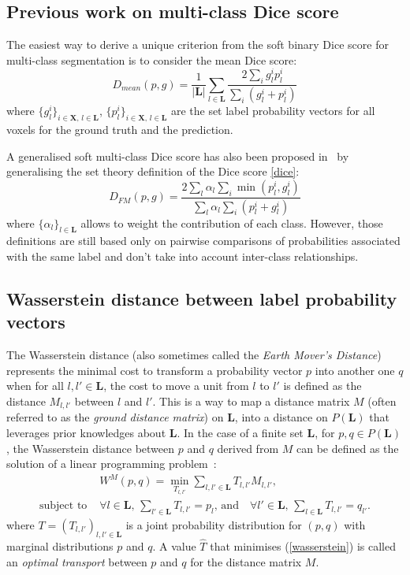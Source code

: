 \documentclass[runningheads,orivec,a4paper]{llncs}
\begin{document}
\subsection{Previous work on multi-class Dice score}
The easiest way to derive a unique criterion from the soft binary Dice score for multi-class segmentation is to consider the mean Dice score:
\begin{equation}\label{mean_dice}
 D_{mean}(p,g) = \frac{1}{|\mathbf{L}|}\sum_{l \in \mathbf{L}}\frac{2\sum_i g^i_lp^i_l}{\sum_i (g^i_l + p^i_l)}
\end{equation}
where $\{g^i_l\}_{i \in \mathbf{X},\, l \in \mathbf{L}}$, $\{p^i_l\}_{i \in \mathbf{X},\, l \in \mathbf{L}}$ are the set label probability vectors for all voxels for the ground truth and the prediction.

A generalised soft multi-class Dice score has also been
proposed in~\cite{gdsc,Sudre2017} by generalising the set theory definition of
the Dice score \eqref{dice}: 
\begin{equation}\label{gdsc}
D_{FM}(p,g) = \frac{2\sum_{l}\alpha_{l}\sum_{i}\min(p^i_l,g^i_l)}{\sum_{l}\alpha_{l}\sum_{i}(p^i_l + g^i_l)}
\end{equation}
where $\{\alpha_l\}_{l \in \mathbf{L}}$ allows to weight the
contribution of each class. However, those definitions are still based
only on pairwise comparisons of probabilities associated with the same
label and don't take into account inter-class relationships.

\subsection{Wasserstein distance between label probability vectors}
The Wasserstein distance (also sometimes called the \emph{Earth
	Mover's Distance}) represents the minimal cost to transform a
probability vector $p$ into another one $q$ when for all $l,l' \in
\mathbf{L}$, the cost to move a unit from $l$ to $l'$ is defined as
the distance $M_{l,l'}$ between $l$ and $l'$. 
This is a way to map a distance matrix $M$
(often referred to as the \emph{ground distance matrix})
on
$\mathbf{L}$, into a distance on $P({\mathbf{L}})$ that leverages
prior knowledges about $\mathbf{L}$. 
In the case of a finite set $\mathbf{L}$, for $p, q \in
P({\mathbf{L}})$, the Wasserstein distance between $p$ and $q$ derived
from $M$ can be defined as the solution of a linear programming
problem~\cite{fast_emd}:
\begin{equation}\label{wasserstein}
\begin{split}
&W^M(p,q) = \min_{T_{l,l'}} \sum_{l,l' \in \mathbf{L}}
T_{l,l'}M_{l,l'}, \\
\textrm{subject to }	&\forall l \in  \mathbf{L}, \, \sum_{l' \in
	\mathbf{L}}T_{l,l'} = p_l,\, \textrm{and} \quad
\forall l' \in  \mathbf{L}, \, \sum_{l \in \mathbf{L}}T_{l,l'} =
q_{l'}.
\end{split}
\end{equation}
where $T=(T_{l,l'})_{l,l' \in \mathbf{L}}$ is a joint probability distribution for $(p,q)$ with marginal distributions $p$ and $q$.
A value $\hat{T}$ that minimises (\ref{wasserstein}) is called an
\emph{optimal transport} between $p$ and $q$ for the distance
matrix $M$.
\end{document}
